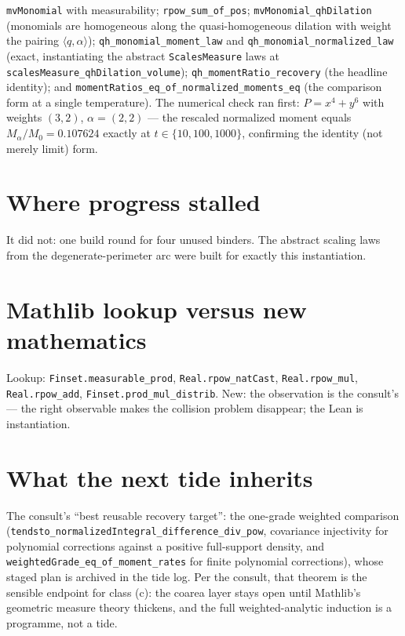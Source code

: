 \documentclass[11pt]{article}
\newcommand{\code}[1]{\texttt{#1}}
\begin{document}
\begin{sloppypar}
\code{mvMonomial} with measurability; \code{rpow\_sum\_of\_pos};
\code{mvMonomial\_qhDilation} (monomials are homogeneous along the
quasi-homogeneous dilation with weight the pairing
$\langle q, \alpha\rangle$);
\code{qh\_monomial\_moment\_law} and
\code{qh\_monomial\_normalized\_law} (exact, instantiating the
abstract \code{ScalesMeasure} laws at
\code{scalesMeasure\_qhDilation\_volume});
\code{qh\_momentRatio\_recovery} (the headline identity); and
\code{momentRatios\_eq\_of\_normalized\_moments\_eq} (the comparison
form at a single temperature). The numerical check ran first:
$P = x^4 + y^6$ with weights $(3,2)$, $\alpha = (2,2)$ --- the
rescaled normalized moment equals $M_\alpha/M_0 = 0.107624$ exactly
at $t \in \{10, 100, 1000\}$, confirming the identity (not merely
limit) form.
\end{sloppypar}

\section{Where progress stalled}

It did not: one build round for four unused binders. The abstract
scaling laws from the degenerate-perimeter arc were built for exactly
this instantiation.

\section{Mathlib lookup versus new mathematics}

Lookup: \code{Finset.measurable\_prod}, \code{Real.rpow\_natCast},
\code{Real.rpow\_mul}, \code{Real.rpow\_add},
\code{Finset.prod\_mul\_distrib}. New: the observation is the
consult's --- the right observable makes the collision problem
disappear; the Lean is instantiation.

\section{What the next tide inherits}

The consult's ``best reusable recovery target'': the one-grade
weighted comparison
(\code{tendsto\_normalizedIntegral\_difference\_div\_pow},
covariance injectivity for polynomial corrections against a positive
full-support density, and \code{weightedGrade\_eq\_of\_moment\_rates}
for finite polynomial corrections), whose staged plan is archived in
the tide log. Per the consult, that theorem is the sensible endpoint
for class (c): the coarea layer stays open until Mathlib's geometric
measure theory thickens, and the full weighted-analytic induction is
a programme, not a tide.
\end{document}

